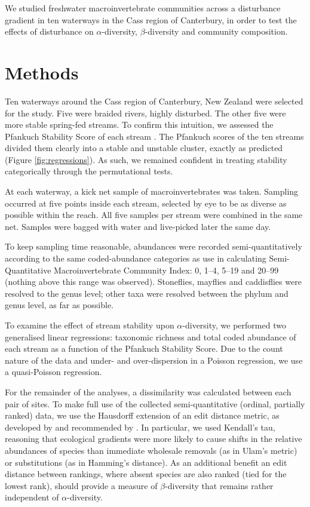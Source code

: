 \documentclass[a4paper,10pt]{article}
\begin{document}
We studied freshwater macroinvertebrate communities across a disturbance gradient in ten waterways in the Cass region of Canterbury, in order to test the effects of disturbance on $\alpha$-diversity, $\beta$-diversity and community composition.

\section*{Methods}

Ten waterways around the Cass region of Canterbury, New Zealand were selected for the study.
Five were braided rivers, highly disturbed.
The other five were more stable spring-fed streams.
To confirm this intuition, we assessed the Pfankuch Stability Score of each stream \parencite{pfankuch, pfankuch-doc}.
The Pfankuch scores of the ten streams divided them clearly into a stable and unstable cluster, exactly as predicted (Figure \ref{fig:regressions}).
As such, we remained confident in treating stability categorically through the permutational tests.

At each waterway, a kick net sample of macroinvertebrates was taken.
Sampling occurred at five points inside each stream, selected by eye to be as diverse as possible within the reach.
All five samples per stream were combined in the same net.
Samples were bagged with water and live-picked later the same day.

To keep sampling time reasonable, abundances were recorded semi-quantitatively according to the same coded-abundance categories as use in calculating  Semi-Quantitative Macroinvertebrate Community Index:
0, 1--4, 5--19 and 20--99 (nothing above this range was observed).
Stoneflies, mayflies and caddisflies were resolved to the genus level; other taxa were resolved between the phylum and genus level, as far as possible.

To examine the effect of stream stability upon $\alpha$-diversity, we performed two generalised linear regressions: taxonomic richness and total coded abundance of each stream as a function of the Pfankuch Stability Score.
Due to the count nature of the data and under- and over-dispersion in a Poisson regression, we use a quasi-Poisson regression.

For the remainder of the analyses, a dissimilarity was calculated between each pair of sites.
To make full use of the collected semi-quantitative (ordinal, partially ranked) data, we use the Hausdorff extension of an edit distance metric, as developed by \textcite{critchlow} and recommended by \textcite{dissimilarity-partially-ranked}.
In particular, we used Kendall's tau, reasoning that ecological gradients were more likely to cause shifts in the relative abundances of species than immediate wholesale removals (as in Ulam's metric) or substitutions (as in Hamming's distance).
As an additional benefit an edit distance between rankings, where absent species are also ranked (tied for the lowest rank), should provide a measure of $\beta$-diversity that remains rather independent of $\alpha$-diversity.
\end{document}

